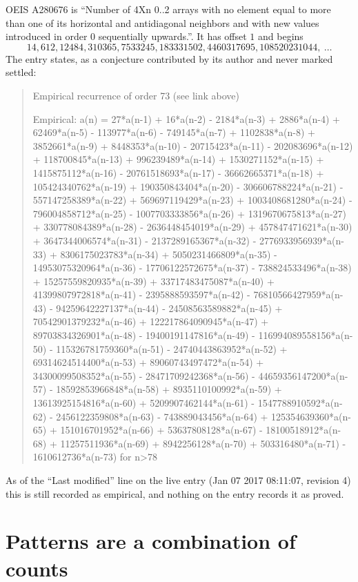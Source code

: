 \documentclass[11pt,a4paper]{article}
\theoremstyle{plain}
\theoremstyle{definition}
\begin{document}
OEIS A280676 is ``Number of 4Xn 0..2 arrays with no element equal to more than one of its horizontal and antidiagonal neighbors and with new values introduced in order 0 sequentially upwards.''. It has offset $1$ and begins
\[
14, 612, 12484, 310365, 7533245, 183331502, 4460317695, 108520231044,\ \dots
\]
The entry states, as a conjecture contributed by its author and never marked settled:
\begin{quote}
Empirical recurrence of order 73 (see link above)

Empirical: a(n) = 27*a(n-1) + 16*a(n-2) - 2184*a(n-3) + 2886*a(n-4) + 62469*a(n-5) - 113977*a(n-6) - 749145*a(n-7) + 1102838*a(n-8) + 3852661*a(n-9) + 8448353*a(n-10) - 20715423*a(n-11) - 202083696*a(n-12) + 118700845*a(n-13) + 996239489*a(n-14) + 1530271152*a(n-15) + 1415875112*a(n-16) - 20761518693*a(n-17) - 36662665371*a(n-18) + 105424340762*a(n-19) + 190350843404*a(n-20) - 306606788224*a(n-21) - 557147258389*a(n-22) + 569697119429*a(n-23) + 1003408681280*a(n-24) - 796004858712*a(n-25) - 1007703333856*a(n-26) + 1319670675813*a(n-27) + 330778084389*a(n-28) - 2636448454019*a(n-29) + 457847471621*a(n-30) + 3647344006574*a(n-31) - 2137289165367*a(n-32) - 2776933956939*a(n-33) + 8306175023783*a(n-34) + 5050231466809*a(n-35) - 14953075320964*a(n-36) - 17706122572675*a(n-37) - 738824533496*a(n-38) + 15257559820935*a(n-39) + 33717483475087*a(n-40) + 41399807972818*a(n-41) - 2395888593597*a(n-42) - 76810566427959*a(n-43) - 94259642227137*a(n-44) - 24508563589882*a(n-45) + 70542901379232*a(n-46) + 122217864090945*a(n-47) + 89703834326901*a(n-48) - 19400191147816*a(n-49) - 116994089558156*a(n-50) - 115326781759360*a(n-51) - 24740443863952*a(n-52) + 69314624514400*a(n-53) + 89060743497472*a(n-54) + 34300099508352*a(n-55) - 28471709242368*a(n-56) - 44659356147200*a(n-57) - 18592853966848*a(n-58) + 8935110100992*a(n-59) + 13613925154816*a(n-60) + 5209907462144*a(n-61) - 1547788910592*a(n-62) - 2456122359808*a(n-63) - 743889043456*a(n-64) + 125354639360*a(n-65) + 151016701952*a(n-66) + 53637808128*a(n-67) - 18100518912*a(n-68) + 11257511936*a(n-69) + 8942256128*a(n-70) + 503316480*a(n-71) - 1610612736*a(n-73) for n>78
\end{quote}
As of the ``Last modified'' line on the live entry (Jan 07 2017 08:11:07, revision 4) this is still
recorded as empirical, and nothing on the entry records it as proved.

\section{Patterns are a combination of counts}
\end{document}

